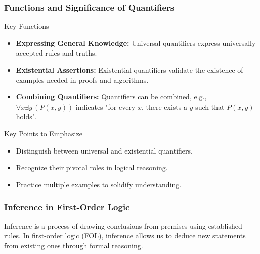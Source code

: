\documentclass[aspectratio=169]{beamer}
\begin{document}
\begin{frame}[fragile]
    \frametitle{Functions and Significance of Quantifiers}
    \begin{block}{Key Functions}
        \begin{itemize}
            \item \textbf{Expressing General Knowledge:} 
            Universal quantifiers express universally accepted rules and truths.
            \item \textbf{Existential Assertions:} 
            Existential quantifiers validate the existence of examples needed in proofs and algorithms.
            \item \textbf{Combining Quantifiers:}
            Quantifiers can be combined, e.g., \( \forall x \exists y \, (P(x, y)) \) indicates "for every \( x \), there exists a \( y \) such that \( P(x, y) \) holds".
        \end{itemize}
    \end{block}
    
    \begin{block}{Key Points to Emphasize}
        \begin{itemize}
            \item Distinguish between universal and existential quantifiers.
            \item Recognize their pivotal roles in logical reasoning.
            \item Practice multiple examples to solidify understanding.
        \end{itemize}
    \end{block}
\end{frame}

\begin{frame}[fragile]
    \frametitle{Inference in First-Order Logic}
    Inference is a process of drawing conclusions from premises using established rules. 
    In first-order logic (FOL), inference allows us to deduce new statements from existing ones through formal reasoning.
\end{frame}
\end{document}
